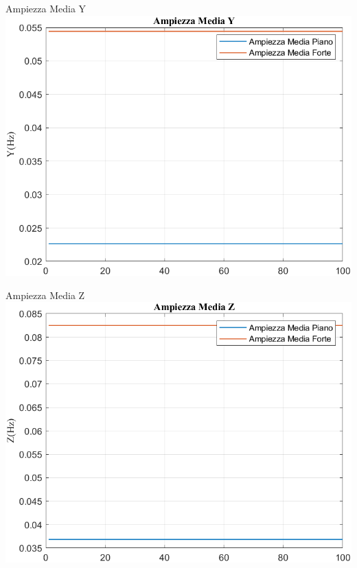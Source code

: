 \documentclass[beamer]{standalone}
\begin{document}
	\begin{frame}{{Ampiezza Media Y}}					
		\centering\includegraphics[height=.8\textheight]{figure/Acc/Trasformata/Ampiezza MediaY}
	\end{frame}
	
	\begin{frame}{{Ampiezza Media Z}}					
		\centering\includegraphics[height=.8\textheight]{figure/Acc/Trasformata/Ampiezza MediaZ}
	\end{frame}
	
\end{document}

